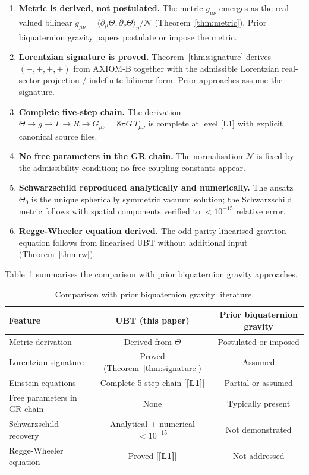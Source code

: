 \documentclass[12pt,a4paper]{article}
\theoremstyle{definition}
\theoremstyle{remark}
\newcommand{\Lone}{\textbf{[L1]}}
\newcommand{\calN}{\mathcal{N}}
\begin{document}
\begin{enumerate}
  \item \textbf{Metric is derived, not postulated.}
        The metric $g_{\mu\nu}$ emerges as the real-valued bilinear
        $g_{\mu\nu} = \langle\partial_\mu\Theta,\partial_\nu\Theta\rangle_\eta/\calN$
        (Theorem~\ref{thm:metric}).
        Prior biquaternion gravity papers postulate or impose the metric.

  \item \textbf{Lorentzian signature is proved.}
        Theorem~\ref{thm:signature} derives $(-,+,+,+)$ from AXIOM-B together with the
        admissible Lorentzian real-sector projection / indefinite bilinear form.
        Prior approaches assume the signature.

  \item \textbf{Complete five-step chain.}
        The derivation $\Theta \to g \to \Gamma \to R \to G_{\mu\nu} = 8\pi G\,T_{\mu\nu}$
        is complete at level [L1] with explicit canonical source files.

  \item \textbf{No free parameters in the GR chain.}
        The normalisation $\calN$ is fixed by the admissibility condition;
        no free coupling constants appear.

  \item \textbf{Schwarzschild reproduced analytically and numerically.}
        The ansatz $\Theta_0$ is the unique spherically symmetric vacuum solution;
        the Schwarzschild metric follows with spatial components verified to
        $< 10^{-15}$ relative error.

  \item \textbf{Regge-Wheeler equation derived.}
        The odd-parity linearised graviton equation follows from linearised
        UBT without additional input (Theorem~\ref{thm:rw}).
\end{enumerate}

Table~\ref{tab:novelty} summarises the comparison with prior biquaternion
gravity approaches.

\begin{table}[ht]
\centering
\caption{Comparison with prior biquaternion gravity literature.}
\label{tab:novelty}
\begin{tabular}{lcc}
\toprule
\textbf{Feature} & \textbf{UBT (this paper)} & \textbf{Prior biquaternion gravity} \\
\midrule
Metric derivation & Derived from $\Theta$ & Postulated or imposed \\
Lorentzian signature & Proved (Theorem~\ref{thm:signature}) & Assumed \\
Einstein equations & Complete 5-step chain [\Lone] & Partial or assumed \\
Free parameters in GR chain & None & Typically present \\
Schwarzschild recovery & Analytical + numerical $<10^{-15}$ & Not demonstrated \\
Regge-Wheeler equation & Proved [\Lone] & Not addressed \\
\bottomrule
\end{tabular}
\end{table}
\end{document}
